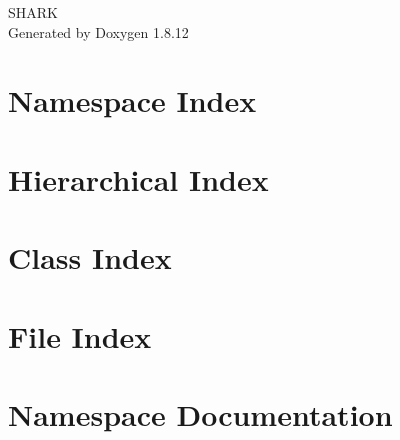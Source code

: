 \documentclass[twoside]{book}
\newcommand{\+}{\discretionary{\mbox{\scriptsize$\hookleftarrow$}}{}{}}
\newcommand{\clearemptydoublepage}{%
  \newpage{\pagestyle{empty}\cleardoublepage}%
}
\begin{document}
\hypersetup{pageanchor=false,
             bookmarksnumbered=true,
             pdfencoding=unicode
            }
\begin{titlepage}
\vspace*{7cm}
\begin{center}%
{\Large S\+H\+A\+RK }\\
\vspace*{1cm}
{\large Generated by Doxygen 1.8.12}\\
\end{center}
\end{titlepage}
\clearemptydoublepage
{}
\tableofcontents
\clearemptydoublepage
{}
\hypersetup{pageanchor=true}

\chapter{Namespace Index}

\chapter{Hierarchical Index}

\chapter{Class Index}

\chapter{File Index}

\chapter{Namespace Documentation}





\end{document}
